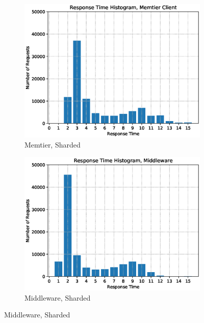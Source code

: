 \documentclass[11pt,a4paper]{article}
\begin{document}
\begin{figure}[H]
    \begin{subfigure}{.5\textwidth}
        \includegraphics[width=1\linewidth]{plots/logSection5c_histogramMemtier.eps}
        \caption{Memtier, Sharded}
    \end{subfigure}
    \begin{subfigure}{.5\textwidth}
        \includegraphics[width=1\linewidth]{plots/logSection5c_histogramMiddleware.eps}
        \caption{Middleware, Sharded}
    \end{subfigure}


\end{figure}
\end{document}
